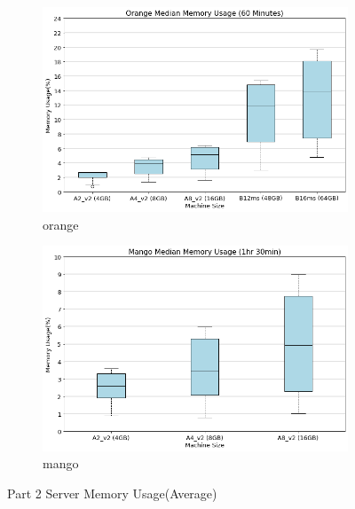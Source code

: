 \begin{figure}[H]
     \centering
     \begin{subfigure}[b]{0.49\textwidth}
         \centering
         \includegraphics[width=\textwidth]{images/orange_mem.png}
         \caption{orange}
         \label{fig:orange_mem}
     \end{subfigure}
     \hfill
     \begin{subfigure}[b]{0.49\textwidth}
         \centering
         \includegraphics[width=\textwidth]{images/mango_mem.png}
         \caption{mango}
         \label{fig:mange_mem}
     \end{subfigure}
    
        \caption{Part 2 Server Memory Usage(Average)}
        \label{fig:part_2_mem}
\end{figure}
